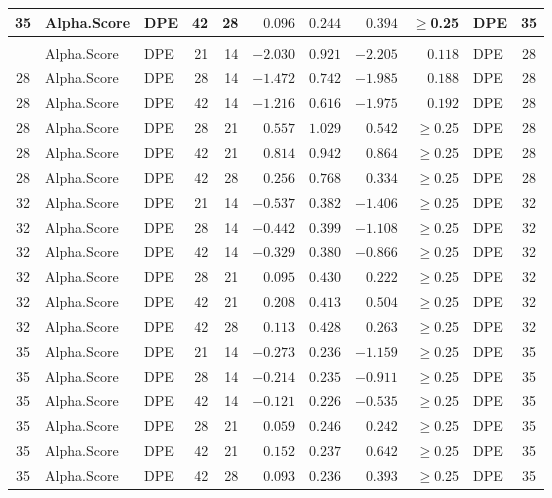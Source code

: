 \documentclass[
]{article}
\begin{document}
\begin{longtable}{cllrrrrrrlc}
35 & Alpha.Score & DPE & 42 & 28 & $0.096$ & $0.244$ & $0.394$ & $\geq$0.25 & DPE & 35 \\ 
\midrule\addlinespace[2.5pt]
\multicolumn{11}{l}{Phylogenetic} \\ 
\midrule\addlinespace[2.5pt]
28 & Alpha.Score & DPE & 21 & 14 & $-2.030$ & $0.921$ & $-2.205$ & $0.118$ & DPE & 28 \\ 
28 & Alpha.Score & DPE & 28 & 14 & $-1.472$ & $0.742$ & $-1.985$ & $0.188$ & DPE & 28 \\ 
28 & Alpha.Score & DPE & 42 & 14 & $-1.216$ & $0.616$ & $-1.975$ & $0.192$ & DPE & 28 \\ 
28 & Alpha.Score & DPE & 28 & 21 & $0.557$ & $1.029$ & $0.542$ & $\geq$0.25 & DPE & 28 \\ 
28 & Alpha.Score & DPE & 42 & 21 & $0.814$ & $0.942$ & $0.864$ & $\geq$0.25 & DPE & 28 \\ 
28 & Alpha.Score & DPE & 42 & 28 & $0.256$ & $0.768$ & $0.334$ & $\geq$0.25 & DPE & 28 \\ 
32 & Alpha.Score & DPE & 21 & 14 & $-0.537$ & $0.382$ & $-1.406$ & $\geq$0.25 & DPE & 32 \\ 
32 & Alpha.Score & DPE & 28 & 14 & $-0.442$ & $0.399$ & $-1.108$ & $\geq$0.25 & DPE & 32 \\ 
32 & Alpha.Score & DPE & 42 & 14 & $-0.329$ & $0.380$ & $-0.866$ & $\geq$0.25 & DPE & 32 \\ 
32 & Alpha.Score & DPE & 28 & 21 & $0.095$ & $0.430$ & $0.222$ & $\geq$0.25 & DPE & 32 \\ 
32 & Alpha.Score & DPE & 42 & 21 & $0.208$ & $0.413$ & $0.504$ & $\geq$0.25 & DPE & 32 \\ 
32 & Alpha.Score & DPE & 42 & 28 & $0.113$ & $0.428$ & $0.263$ & $\geq$0.25 & DPE & 32 \\ 
35 & Alpha.Score & DPE & 21 & 14 & $-0.273$ & $0.236$ & $-1.159$ & $\geq$0.25 & DPE & 35 \\ 
35 & Alpha.Score & DPE & 28 & 14 & $-0.214$ & $0.235$ & $-0.911$ & $\geq$0.25 & DPE & 35 \\ 
35 & Alpha.Score & DPE & 42 & 14 & $-0.121$ & $0.226$ & $-0.535$ & $\geq$0.25 & DPE & 35 \\ 
35 & Alpha.Score & DPE & 28 & 21 & $0.059$ & $0.246$ & $0.242$ & $\geq$0.25 & DPE & 35 \\ 
35 & Alpha.Score & DPE & 42 & 21 & $0.152$ & $0.237$ & $0.642$ & $\geq$0.25 & DPE & 35 \\ 
35 & Alpha.Score & DPE & 42 & 28 & $0.093$ & $0.236$ & $0.393$ & $\geq$0.25 & DPE & 35 \\ 
\bottomrule
\end{longtable}
\end{document}
